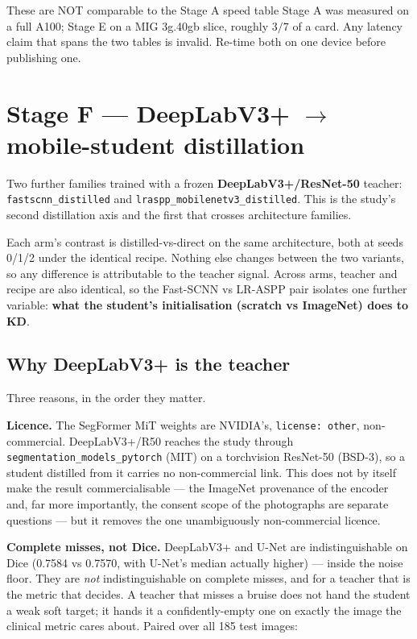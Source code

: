 \documentclass[11pt]{article}
\begin{document}
\begin{warnbox}{These are NOT comparable to the Stage A speed table}
Stage A was measured on a full A100; Stage E on a MIG 3g.40gb slice, roughly
$3/7$ of a card. Any latency claim that spans the two tables is invalid. Re-time
both on one device before publishing one.
\end{warnbox}

\section{Stage F --- DeepLabV3+ $\rightarrow$ mobile-student distillation}

\begin{sloppypar}
Two further families trained with a frozen \textbf{DeepLabV3+/ResNet-50} teacher:
\texttt{fastscnn\_distilled} and \texttt{lraspp\_mobilenetv3\_distilled}. This is
the study's second distillation axis and the first that crosses architecture
families.
\end{sloppypar}

Each arm's contrast is distilled-vs-direct on the same architecture, both at
seeds 0/1/2 under the identical recipe. Nothing else changes between the two
variants, so any difference is attributable to the teacher signal. Across arms,
teacher and recipe are also identical, so the Fast-SCNN vs LR-ASPP pair isolates
one further variable: \textbf{what the student's initialisation (scratch vs
ImageNet) does to KD}.

\subsection{Why DeepLabV3+ is the teacher}

Three reasons, in the order they matter.

\textbf{Licence.} The SegFormer MiT weights are NVIDIA's, \texttt{license: other},
non-commercial. DeepLabV3+/R50 reaches the study through
\texttt{segmentation\_models\_pytorch} (MIT) on a torchvision ResNet-50 (BSD-3),
so a student distilled from it carries no non-commercial link. This does not by
itself make the result commercialisable --- the ImageNet provenance of the
encoder and, far more importantly, the consent scope of the photographs are
separate questions --- but it removes the one unambiguously non-commercial
licence.

\textbf{Complete misses, not Dice.} DeepLabV3+ and U-Net are indistinguishable on
Dice (0.7584 vs 0.7570, with U-Net's median actually higher) --- inside the noise
floor. They are \emph{not} indistinguishable on complete misses, and for a teacher
that is the metric that decides. A teacher that misses a bruise does not hand the
student a weak soft target; it hands it a confidently-empty one on exactly the
image the clinical metric cares about. Paired over all 185 test images:
\end{document}
